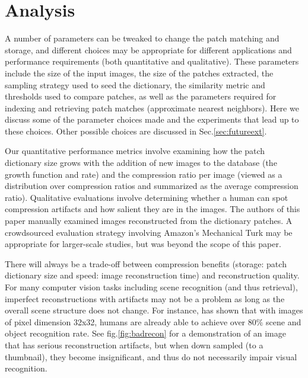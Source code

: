 \section{Analysis}\label{sec:analysis}

A number of parameters can be tweaked to change the patch matching and storage, and different choices may be appropriate for different applications and performance requirements (both quantitative and qualitative). These parameters include the size of the input images, the size of the patches extracted, the sampling strategy used to seed the dictionary, the similarity metric and thresholds used to compare patches, as well as the parameters required for indexing and retrieving patch matches (approximate nearest neighbors). Here we discuss some of the parameter choices made and the experiments that lead up to these choices. Other possible choices are discussed in Sec.\ref{sec:futureext}.

Our quantitative performance metrics involve examining how the patch dictionary size grows with the addition of new images to the database (the growth function and rate) and the compression ratio per image (viewed as a distribution over compression ratios and summarized as the average compression ratio). Qualitative evaluations involve determining whether a human can spot compression artifacts and how salient they are in the images. The authors of this paper manually examined images reconstructed from the dictionary patches. A crowdsourced evaluation strategy involving Amazon's Mechanical Turk may be appropriate for larger-scale studies, but was beyond the scope of this paper.

There will always be a trade-off between compression benefits (storage: patch dictionary size and speed: image reconstruction time) and reconstruction quality. For many computer vision tasks including scene recognition (and thus retrieval), imperfect reconstructions with artifacts may not be a problem as long as the overall scene structure does not change. For instance, \cite{tiny_images} has shown that with images of pixel dimension 32x32, humans are already able to achieve over $80\%$ scene and object recognition rate. See fig.\ref{fig:badrecon} for a demonstration of an image that has serious reconstruction artifacts, but when down sampled (to a thumbnail), they become insignificant, and thus do not necessarily impair visual recognition.

